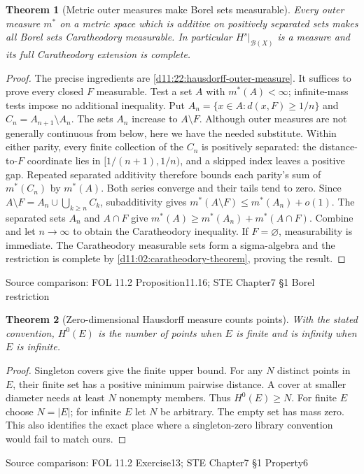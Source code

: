 \documentclass[11pt,oneside,openany]{book}
\newtheorem{theorem}{Theorem}[chapter]
\theoremstyle{definition}
\theoremstyle{remark}
\newcommand{\BB}{\mathcal B}\newcommand{\SSS}{\mathcal S}
\newcommand{\family}[1]{}
\newcommand{\source}[1]{\par\begingroup\small\sffamily\color{black!65}Source comparison: #1\par\endgroup}
\begin{document}
\begin{theorem}[Metric outer measures make Borel sets measurable]\family{D11.22.metric_outer_borel}\label{d11:22:metric-outer-borel}
Every outer measure $m^*$ on a metric space which is additive on positively separated sets makes all Borel sets Caratheodory measurable. In particular $H^s|_{\BB(X)}$ is a measure and its full Caratheodory extension is complete.
\end{theorem}
\begin{proof}
The precise ingredients are \cref{d11:22:hausdorff-outer-measure}. It suffices to prove every closed $F$ measurable. Test a set $A$ with $m^*(A)<\infty$; infinite-mass tests impose no additional inequality. Put $A_n=\{x\in A:d(x,F)\ge1/n\}$ and $C_n=A_{n+1}\setminus A_n$. The sets $A_n$ increase to $A\setminus F$. Although outer measures are not generally continuous from below, here we have the needed substitute. Within either parity, every finite collection of the $C_n$ is positively separated: the distance-to-$F$ coordinate lies in $[1/(n+1),1/n)$, and a skipped index leaves a positive gap. Repeated separated additivity therefore bounds each parity's sum of $m^*(C_n)$ by $m^*(A)$. Both series converge and their tails tend to zero. Since
$A\setminus F=A_n\cup\bigcup_{k\ge n}C_k$,
subadditivity gives $m^*(A\setminus F)\le m^*(A_n)+o(1)$. The separated sets $A_n$ and $A\cap F$ give $m^*(A)\ge m^*(A_n)+m^*(A\cap F)$. Combine and let $n\to\infty$ to obtain the Caratheodory inequality. If $F=\varnothing$, measurability is immediate. The Caratheodory measurable sets form a sigma-algebra and the restriction is complete by \cref{d11:02:caratheodory-theorem}, proving the result.
\end{proof}
\source{FOL 11.2 Proposition11.16; STE Chapter7 §1 Borel restriction}

\begin{theorem}[Zero-dimensional Hausdorff measure counts points]\family{D11.22.zero_dimension_counting}\label{d11:22:zero-dimension-counting}
With the stated convention, $H^0(E)$ is the number of points when $E$ is finite and is infinity when $E$ is infinite.
\end{theorem}
\begin{proof}
Singleton covers give the finite upper bound. For any $N$ distinct points in $E$, their finite set has a positive minimum pairwise distance. A cover at smaller diameter needs at least $N$ nonempty members. Thus $H^0(E)\ge N$. For finite $E$ choose $N=|E|$; for infinite $E$ let $N$ be arbitrary. The empty set has mass zero. This also identifies the exact place where a singleton-zero library convention would fail to match ours.
\end{proof}
\source{FOL 11.2 Exercise13; STE Chapter7 §1 Property6}
\end{document}
